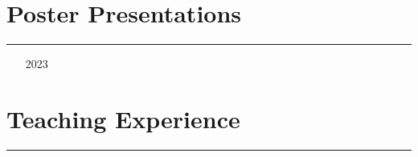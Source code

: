 \documentclass{article}
\begin{document}
\section*{Poster Presentations}
\hrule
\vspace{10pt}

\begin{itemize}[leftmargin=1.5in]
    \item[2023] 
\end{itemize}

\section*{Teaching Experience}
\hrule
\vspace{10pt}
\end{document}
